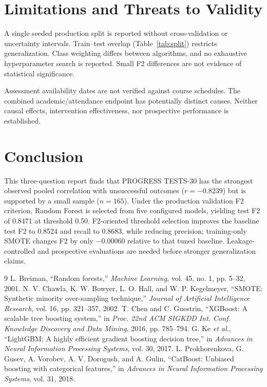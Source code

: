 \documentclass[conference]{IEEEtran}
\begin{document}
\section{Limitations and Threats to Validity}
A single seeded production split is reported without cross-validation or uncertainty intervals. Train--test overlap (Table~\ref{tab:split}) restricts generalization. Class weighting differs between algorithms, and no exhaustive hyperparameter search is reported. Small F2 differences are not evidence of statistical significance.

Assessment availability dates are not verified against course schedules. The combined academic/attendance endpoint has potentially distinct causes. Neither causal effects, intervention effectiveness, nor prospective performance is established.

\section{Conclusion}
This three-question report finds that PROGRESS TESTS-30 has the strongest observed pooled correlation with unsuccessful outcomes ($r=-0.8239$) but is supported by a small sample ($n=165$). Under the production validation F2 criterion, Random Forest is selected from five configured models, yielding test F2 of 0.8471 at threshold 0.50. F2-oriented threshold selection improves the baseline test F2 to 0.8524 and recall to 0.8683, while reducing precision; training-only SMOTE changes F2 by only $-0.00060$ relative to that tuned baseline. Leakage-controlled and prospective evaluations are needed before stronger generalization claims.

\begin{thebibliography}{9}
 L. Breiman, ``Random forests,'' \emph{Machine Learning}, vol. 45, no. 1, pp. 5--32, 2001.
 N. V. Chawla, K. W. Bowyer, L. O. Hall, and W. P. Kegelmeyer, ``SMOTE: Synthetic minority over-sampling technique,'' \emph{Journal of Artificial Intelligence Research}, vol. 16, pp. 321--357, 2002.
 T. Chen and C. Guestrin, ``XGBoost: A scalable tree boosting system,'' in \emph{Proc. 22nd ACM SIGKDD Int. Conf. Knowledge Discovery and Data Mining}, 2016, pp. 785--794.
 G. Ke \emph{et al.}, ``LightGBM: A highly efficient gradient boosting decision tree,'' in \emph{Advances in Neural Information Processing Systems}, vol. 30, 2017.
 L. Prokhorenkova, G. Gusev, A. Vorobev, A. V. Dorogush, and A. Gulin, ``CatBoost: Unbiased boosting with categorical features,'' in \emph{Advances in Neural Information Processing Systems}, vol. 31, 2018.
\end{thebibliography}
\end{document}
